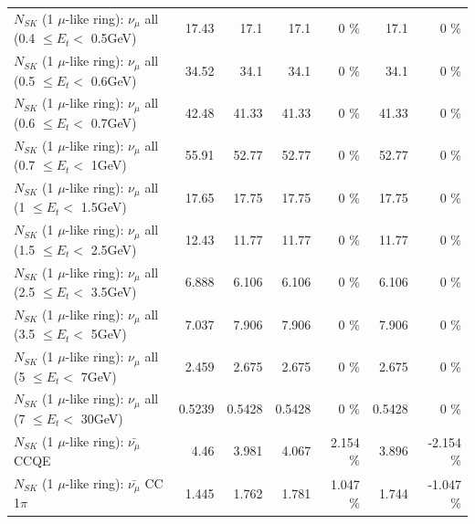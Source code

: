 \begin{table}
\begin{tabular}{| l | r | r | r  r | r  r |}
       $N_{SK}$ (1 $\mu$-like ring): $\nu_{\mu}$ all (0.4 $\leq E_{t} <$ 0.5GeV) &           17.43 &            17.1 &            17.1 &        0 \%  &            17.1 &        0 \%  \\ 
       $N_{SK}$ (1 $\mu$-like ring): $\nu_{\mu}$ all (0.5 $\leq E_{t} <$ 0.6GeV) &           34.52 &            34.1 &            34.1 &        0 \%  &            34.1 &        0 \%  \\ 
       $N_{SK}$ (1 $\mu$-like ring): $\nu_{\mu}$ all (0.6 $\leq E_{t} <$ 0.7GeV) &           42.48 &           41.33 &           41.33 &        0 \%  &           41.33 &        0 \%  \\ 
         $N_{SK}$ (1 $\mu$-like ring): $\nu_{\mu}$ all (0.7 $\leq E_{t} <$ 1GeV) &           55.91 &           52.77 &           52.77 &        0 \%  &           52.77 &        0 \%  \\ 
         $N_{SK}$ (1 $\mu$-like ring): $\nu_{\mu}$ all (1 $\leq E_{t} <$ 1.5GeV) &           17.65 &           17.75 &           17.75 &        0 \%  &           17.75 &        0 \%  \\ 
       $N_{SK}$ (1 $\mu$-like ring): $\nu_{\mu}$ all (1.5 $\leq E_{t} <$ 2.5GeV) &           12.43 &           11.77 &           11.77 &        0 \%  &           11.77 &        0 \%  \\ 
       $N_{SK}$ (1 $\mu$-like ring): $\nu_{\mu}$ all (2.5 $\leq E_{t} <$ 3.5GeV) &           6.888 &           6.106 &           6.106 &        0 \%  &           6.106 &        0 \%  \\ 
         $N_{SK}$ (1 $\mu$-like ring): $\nu_{\mu}$ all (3.5 $\leq E_{t} <$ 5GeV) &           7.037 &           7.906 &           7.906 &        0 \%  &           7.906 &        0 \%  \\ 
           $N_{SK}$ (1 $\mu$-like ring): $\nu_{\mu}$ all (5 $\leq E_{t} <$ 7GeV) &           2.459 &           2.675 &           2.675 &        0 \%  &           2.675 &        0 \%  \\ 
          $N_{SK}$ (1 $\mu$-like ring): $\nu_{\mu}$ all (7 $\leq E_{t} <$ 30GeV) &          0.5239 &          0.5428 &          0.5428 &        0 \%  &          0.5428 &        0 \%  \\ 
\hline
\hline
\hline
                              $N_{SK}$ (1 $\mu$-like ring): $\bar{\nu_\mu}$ CCQE &            4.46 &           3.981 &           4.067 &    2.154 \%  &           3.896 &   -2.154 \%  \\ 
                         $N_{SK}$ (1 $\mu$-like ring): $\bar{\nu_\mu}$ CC 1$\pi$ &           1.445 &           1.762 &           1.781 &    1.047 \%  &           1.744 &   -1.047 \%  \\ 

\end{tabular}
\end{table}
